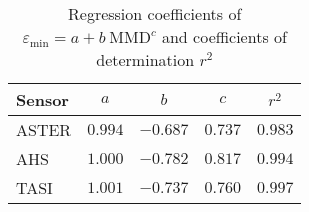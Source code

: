 \begin{table}[!t]
\renewcommand{\arraystretch}{1.5}
\caption{Regression coefficients of $\varepsilon_\mathrm{min} = a + b\:\mathrm{MMD}^c$ and coefficients of determination $r^2$}
\label{table:MMDcoef}
\centering
\begin{tabular}{lcccc}
\hline
Sensor & $a$ & $b$ & $c$ & $r^2$\\ \hline
ASTER & $0.994$ & $-0.687$ & $0.737$ & $0.983$ \\
AHS & $1.000$ & $-0.782$ & $0.817$ & $0.994$ \\
TASI & $1.001$ & $-0.737$ & $0.760$ & $0.997$ \\
\hline
\end{tabular}
\end{table}
